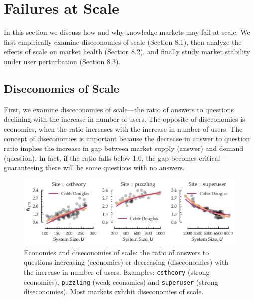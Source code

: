 \section{Failures at Scale}
In this section we discuss how and why knowledge markets may fail at scale. We first empirically examine diseconomies of scale (Section 8.1), then analyze the effects of scale on market health (Section 8.2), and finally study market stability under user perturbation (Section 8.3).

\subsection{Diseconomies of Scale}
First, we examine disceconomies of scale---the ratio of answers to questions declining with the increase in number of users. The opposite of diseconomies is economies, when the ratio increases with the increase in number of users. The concept of diseconomies is important because the decrease in answer to question ratio implies the increase in gap between market supply (answer) and demand (question). In fact, if the ratio falls below 1.0, the gap becomes critical---guaranteeing there will be some questions with no answers. 

\begin{figure}[hbt]
\vspace{-0.5\baselineskip}
\centering
\includegraphics[scale=0.38]{Figures/Size_vs_Diseconomy.pdf}
\vspace{-2\baselineskip}
\caption{Economies and diseconomies of scale: the ratio of answers to questions increasing (economies) or decreasing (diseconomies) with the increase in number of users. Examples: \texttt{cstheory} (strong economies), \texttt{puzzling} (weak economies) and \texttt{superuser} (strong diseconomies). Most markets exhibit diseconomies of scale.}
\vspace{-\baselineskip}
\label{fig:diseconomy}
\end{figure}

